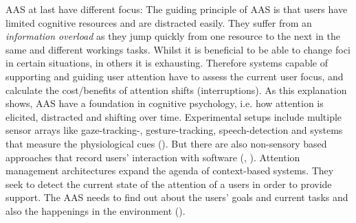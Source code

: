 \ac{AAS} at last have different focus: The guiding principle of \acs{AAS} is that users have limited cognitive resources and are distracted easily. They suffer from an \textit{information overload} as they jump quickly from one resource to the next in the same and different workings tasks. Whilst it is beneficial to be able to change foci in certain situations, in others it is exhausting. Therefore systems capable of supporting and guiding user attention have to assess the current user focus, and calculate the cost/benefits of attention shifts (interruptions). As this explanation shows, \acs{AAS} have a foundation in cognitive psychology, i.e. how attention is elicited, distracted and shifting over time. Experimental setups include multiple sensor arrays like  gaze-tracking-, gesture-tracking, speech-detection and systems that measure the physiological cues (\cite{roda2006attention}). But there are also non-sensory based approaches that record users' interaction with software (\cite{horvitz2003models}, \cite{schmitz2011contextualized}). Attention management architectures expand the agenda of context-based systems. They seek to detect the current state of the attention of a users in order to provide support. The \ac{AAS} needs to find out about the users' goals and current tasks and also the happenings in the environment (\cite{roda2006attention}). 

